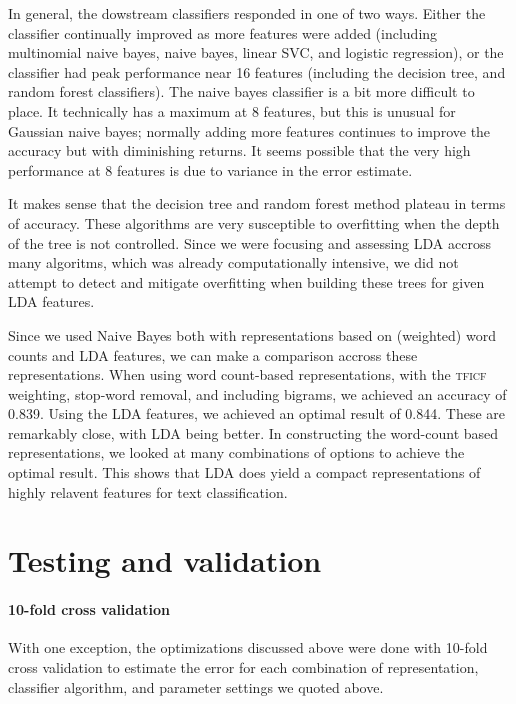 \documentclass[conference,letterpaper]{IEEEtran}
\begin{document}
In general, the dowstream classifiers responded in one of two ways.  Either
the classifier continually improved as more features were added
(including multinomial naive bayes, naive bayes, linear SVC, and logistic 
regression), or the classifier had peak performance near 16 features 
(including the decision tree, and random forest classifiers).  The naive bayes
classifier is a bit more difficult to place.  It technically has a maximum at
8 features, but this is unusual for Gaussian naive bayes; normally adding
more features continues to improve the accuracy but with diminishing returns.  
It seems possible that the very high performance at 8 features is due to 
variance in the error estimate.

It makes sense that the decision tree and random forest method plateau
in terms of accuracy.  These algorithms are very susceptible to overfitting
when the depth of the tree is not controlled.  Since we were focusing and 
assessing LDA accross many algoritms, which was already computationally 
intensive, we did not attempt to detect and mitigate overfitting when building
these trees for given LDA features.

Since we used Naive Bayes both with representations based on (weighted)
word counts and LDA features, we can make a comparison accross these 
representations.  When using word count-based representations, with the \textsc{tficf} weighting, stop-word removal, and including bigrams, we achieved an
accuracy of 0.839.  Using the LDA features, we achieved an optimal result
of 0.844.  These are remarkably close, with LDA being better.  In constructing 
the word-count based representations, we looked at many combinations of 
options to achieve the optimal result.  This shows that LDA does yield a 
compact representations of highly relavent features for text classification.

\section{Testing and validation}
\paragraph*{10-fold cross validation} 
With one exception, the optimizations discussed above were done with 
10-fold cross validation to estimate the error for each combination of 
representation, classifier algorithm, and parameter settings we quoted above.
\end{document}
